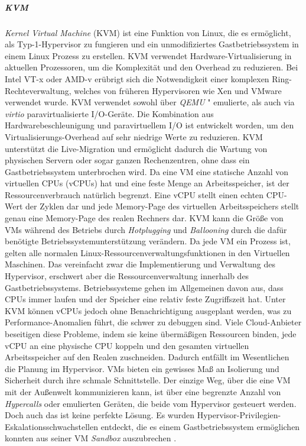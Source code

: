 \subparagraph{KVM}
\emph{Kernel Virtual Machine} (KVM) ist eine Funktion von Linux, die es ermöglicht, als Typ-1-Hypervisor zu fungieren und ein unmodifiziertes Gastbetriebssystem in einem Linux Prozess zu erstellen. KVM verwendet Hardware-Virtualisierung in aktuellen Prozessoren, um die Komplexität und den Overhead zu reduzieren. Bei Intel VT-x oder AMD-v erübrigt sich die Notwendigkeit einer komplexen Ring-Rechteverwaltung, welches von früheren Hypervisoren wie Xen und VMware verwendet wurde. KVM verwendet sowohl über \emph{QEMU} \cite{QEMUEmulator}" emulierte, als auch via \emph{virtio} \cite{View2018VirtioVirtio} paravirtualisierte I/O-Geräte. Die Kombination aus Hardwarebeschleunigung und paravirtuellem I/O ist entwickelt worden, um den Virtualisierungs-Overhead auf sehr niedrige Werte zu reduzieren. KVM unterstützt die Live-Migration und ermöglicht dadurch die Wartung von physischen Servern oder sogar ganzen Rechenzentren, ohne dass ein Gastbetriebssystem unterbrochen wird. Da eine VM eine statische Anzahl von virtuellen CPUs (vCPUs) hat und eine feste Menge an Arbeitsspeicher, ist der Ressourcenverbrauch natürlich begrenzt. Eine vCPU stellt einen echten CPU-Wert der Zyklen dar und jede Memory-Page des virtuellen Arbeitsspeichers stellt genau eine Memory-Page des realen Rechners dar. KVM kann die Größe von VMs während des Betriebs durch \emph{Hotplugging} und \emph{Ballooning} durch die dafür benötigte Betriebssystemunterstützung verändern. Da jede VM ein Prozess ist, gelten alle normalen Linux-Ressourcenverwaltungsfunktionen in den Virtuellen Maschinen. Das vereinfacht zwar die Implementierung und Verwaltung des Hypervisor, erschwert aber die Ressourcenverwaltung innerhalb des Gastbetriebssystems. Betriebssysteme gehen im Allgemeinen davon aus, dass CPUs immer laufen und der Speicher eine relativ feste Zugriffszeit hat. Unter KVM können vCPUs jedoch ohne Benachrichtigung ausgeplant werden, was zu Performance-Anomalien führt, die schwer zu debuggen sind. Viele Cloud-Anbieter beseitigen diese Probleme, indem sie keine übermäßigen Ressourcen binden, jede vCPU an eine physische CPU koppeln und den gesamten virtuellen Arbeitsspeicher auf den Realen zuschneiden. Dadurch entfällt im Wesentlichen die Planung im Hypervisor. VMs bieten ein gewisses Maß an Isolierung und Sicherheit durch ihre schmale Schnittstelle. Der einzige Weg, über die eine VM mit der Außenwelt kommunizieren kann, ist über eine begrenzte Anzahl von \emph{Hypercalls} oder emulierten Geräten, die beide vom Hypervisor gesteuert werden. Doch auch das ist keine perfekte Lösung. Es wurden Hypervisor-Privilegien-Eskalationsschwachstellen entdeckt, die es einem Gastbetriebssystem ermöglichen konnten aus seiner VM \emph{Sandbox} auszubrechen \cite{Felter2014IBMContainers}.


